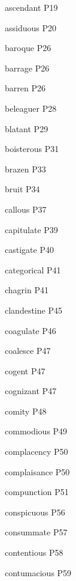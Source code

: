 \documentclass[12pt, a4paper, twocolumn]{article}
\begin{document}
    ascendant \hfill P19 

    assiduous \hfill P20 

    baroque \hfill P26 

    barrage \hfill P26 

    barren \hfill P26 

    beleaguer \hfill P28 

    blatant \hfill P29 

    boisterous \hfill P31

    brazen \hfill P33
    
    bruit \hfill P34

    callous \hfill P37 

    capitulate \hfill P39 

    castigate \hfill P40 

    categorical \hfill P41 

    chagrin \hfill P41 

    clandestine \hfill P45 

    coagulate \hfill P46 

    coalesce \hfill P47 
    
    cogent \hfill P47

    cognizant \hfill P47 

    comity \hfill P48 

    commodious \hfill P49 

    complacency \hfill P50 

    complaisance \hfill P50 

    compunction \hfill P51 

    conspicuous \hfill P56 

    consummate \hfill P57

    contentious \hfill P58

    contumacious \hfill P59 

    
\end{document}
